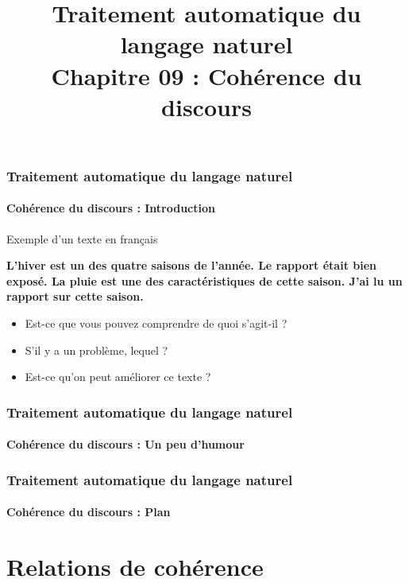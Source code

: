 \documentclass[xcolor=table]{beamer}
\title[TALN : 09- Cohérence du discours]%
{Traitement automatique du langage naturel\\Chapitre 09 : Cohérence du discours}
\begin{document}
	
\begin{frame}
\frametitle{Traitement automatique du langage naturel}
\framesubtitle{Cohérence du discours : Introduction}

\begin{exampleblock}{Exemple d'un texte en français}
	\begin{center}
		\Large\bfseries
		L'hiver est un des quatre saisons de l'année. 
		Le rapport était bien exposé. 
		La pluie est une des caractéristiques de cette saison.
		J'ai lu un rapport sur cette saison.
	\end{center}
\end{exampleblock}

\begin{itemize}
	\item Est-ce que vous pouvez comprendre de quoi s'agit-il ?
	\item S'il y a un problème, lequel ?
	\item Est-ce qu'on peut améliorer ce texte ?
\end{itemize}

\end{frame}

\begin{frame}
\frametitle{Traitement automatique du langage naturel}
\framesubtitle{Cohérence du discours :  Un peu d'humour}

\begin{center}
\end{center}

\end{frame}

\begin{frame}
\frametitle{Traitement automatique du langage naturel}
\framesubtitle{Cohérence du discours : Plan}

\begin{multicols}{2}
\tableofcontents
\end{multicols}
\end{frame}

\section{Relations de cohérence}
\end{document}
